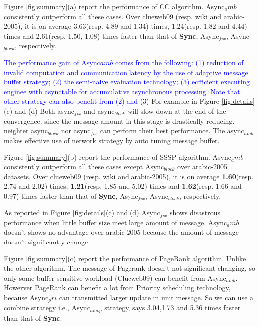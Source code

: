  Figure \ref{fig:summary}(a) report the performance of CC algorithm. Async$_amb$ consistently outperform all these cases. Over clueweb09 (resp. wiki and arabic-2005), it is on average 3.63(resp. 4.89 and 1.34) times, 1.24(resp. 1.82 and 4.44) times and  2.61(resp. 1.50, 1.08) times faster than that of \textbf{Sync}, Async$_{fix}$, Async$_{block}$, respectively. 

\textcolor{blue}{
The performance gain of Async${amb}$ comes from the following:
(1) reduction of invalid computation and communication latency by the use of adaptive message buffer strategy; 
(2) the semi-naive evaluation technology;
(3) ecfficient executing enginee with asynctable for accumulative asynchronous processing.
Note that other strategy can also benefit from (2) and (3)}
For example in Figure \ref{fig:details}(c) and (d) Both async$_{fix}$ and  async$_{block}$ will slow down at the end of the convergence. since the message amount in this stage is drastically reducing. neighter async$_{block}$ nor async$_{fix}$ can perform their best performance. The async$_{amb}$ makes effective use of network strategy by auto tuning message buffer.

 Figure \ref{fig:summary}(b) report the performance of SSSP algorithm. Async$_amb$ consistently outperform all these cases except Async$_{block}$ over arabic-2005 datasets. Over clueweb09 (resp. wiki and arabic-2005), it is on average  \textbf{1.60}(resp. 2.74 and 2.02) times, \textbf{1.21}(resp. 1.85 and 5.02) times and  \textbf{1.62}(resp. 1.66 and 0.97) times faster than that of \textbf{Sync}, Async$_{fix}$, Async$_{block}$, respectively. 

As reported in Figure \ref{fig:details}(c) and (d) Async$_{fix}$ shows disastrous performance when little buffer size meet large amount of message. Async$_amb$ doesn't shows no advantage over arabic-2005 because the amount of message doesn't significantly change.


 Figure \ref{fig:summary}(c) report the performance of PageRank algorithm. Unlike the other algorithm, The message of Pagerank doesn't not significant changing, so only some buffer sensitive workload (Clueweb09) can benefit from Async$_{amb}$. Howerver PageRank can benefit a lot from Priority scheduling technology, because Async$_pri$ can transmitted larger update in unit message. So we can use a combine strategy i.e., Async$_{ambp}$ strategy, says 3.04,1.73 and 5.36  times faster than that of \textbf{Sync}.
 
